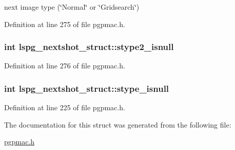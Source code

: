 next image type (\char`\"{}Normal\char`\"{} or \char`\"{}Gridsearch\char`\"{}) 

Definition at line 275 of file pgpmac.h.\hypertarget{structlspg__nextshot__struct_a203e29ed0bb403aaab6d7f95f690cc0d}{
\subsubsection[{stype2\_\-isnull}]{\setlength{\rightskip}{0pt plus 5cm}int {\bf lspg\_\-nextshot\_\-struct::stype2\_\-isnull}}}
\label{structlspg__nextshot__struct_a203e29ed0bb403aaab6d7f95f690cc0d}


Definition at line 276 of file pgpmac.h.\hypertarget{structlspg__nextshot__struct_a79f48c452a4aca8506bae22f897c7441}{
\subsubsection[{stype\_\-isnull}]{\setlength{\rightskip}{0pt plus 5cm}int {\bf lspg\_\-nextshot\_\-struct::stype\_\-isnull}}}
\label{structlspg__nextshot__struct_a79f48c452a4aca8506bae22f897c7441}


Definition at line 225 of file pgpmac.h.

The documentation for this struct was generated from the following file:\begin{DoxyCompactItemize}
\item 
\hyperlink{pgpmac_8h}{pgpmac.h}\end{DoxyCompactItemize}
